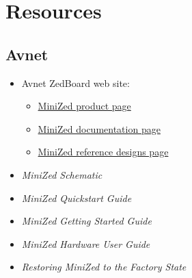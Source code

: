 \section{Resources}

\subsection{Avnet}
%
\begin{itemize}
\item Avnet ZedBoard web site:
\begin{itemize}
\item \href{http://zedboard.org/product/minized}{MiniZed product page}
\item \href{http://zedboard.org/support/documentation/18891}{MiniZed documentation page}
\item \href{http://zedboard.org/support/design/18891/146}{MiniZed reference designs page}
\end{itemize}
%
\item \emph{MiniZed Schematic}~\cite{Avnet_MiniZed_Schematic_2017}
\item \emph{MiniZed Quickstart Guide}~\cite{Avnet_MiniZed_QSC_2017}
\item \emph{MiniZed Getting Started Guide}~\cite{Avnet_MiniZed_GSG_2018}
\item \emph{MiniZed Hardware User Guide}~\cite{Avnet_MiniZed_HW_2017}
\item \emph{Restoring MiniZed to the Factory State}~\cite{Avnet_MiniZed_Restore_2018}
\end{itemize}

